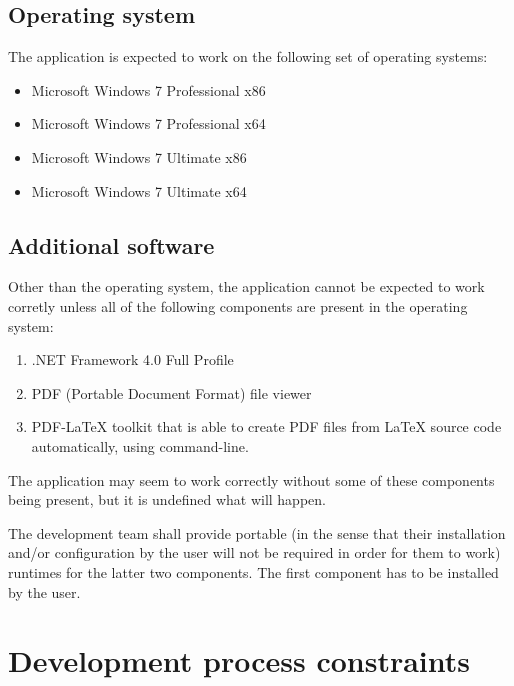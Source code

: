\documentclass{article}
\begin{document}
\subsection{Operating system}

The application is expected to work on the following set of operating systems:

\begin{itemize}

  \item Microsoft Windows 7 Professional x86

  \item Microsoft Windows 7 Professional x64

  \item Microsoft Windows 7 Ultimate x86

  \item Microsoft Windows 7 Ultimate x64

\end{itemize}

\subsection{Additional software}

Other than the operating system, the application cannot be expected to work corretly unless all of the
following components are present in the operating system:

\begin{enumerate}

  \item .NET Framework 4.0 Full Profile

  \item PDF (Portable Document Format) file viewer

  \item PDF-LaTeX toolkit that is able to create PDF files from LaTeX source code automatically, using
  command-line.

\end{enumerate}

The application may seem to work correctly without some of these components being present, but it is
undefined what will happen.

The development team shall provide portable (in the sense that their installation and/or
configuration by the user will not be required in order for them to work) runtimes for the latter
two components. The first component has to be installed by the user.

\section{Development process constraints}
\end{document}
